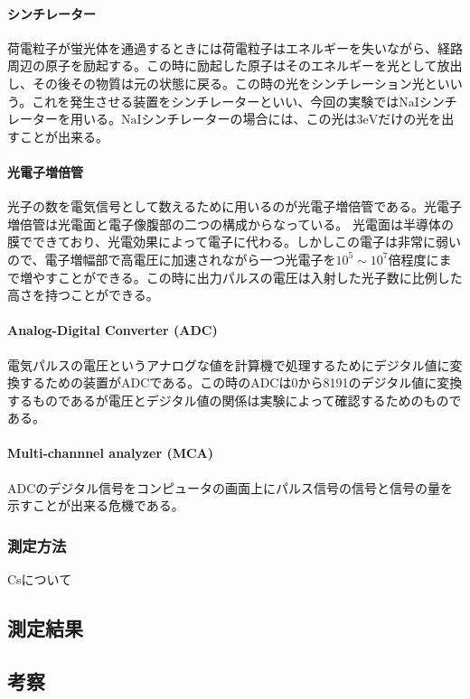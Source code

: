 \documentclass[titlepage]{ltjsarticle}
\begin{document}
\paragraph{シンチレーター}
荷電粒子が蛍光体を通過するときには荷電粒子はエネルギーを失いながら、経路周辺の原子を励起する。この時に励起した原子はそのエネルギーを光として放出し、その後その物質は元の状態に戻る。この時の光をシンチレーション光といいう。これを発生させる装置をシンチレーターといい、今回の実験では\(\mathrm{NaI}\)シンチレーターを用いる。\(\mathrm{NaI}\)シンチレーターの場合には、この光は\(3 \mathrm{eV}\)だけの光を出すことが出来る。

\paragraph{光電子増倍管}
光子の数を電気信号として数えるために用いるのが光電子増倍管である。光電子増倍管は光電面と電子像腹部の二つの構成からなっている。
光電面は半導体の膜でできており、光電効果によって電子に代わる。しかしこの電子は非常に弱いので、電子増幅部で高電圧に加速されながら一つ光電子を\(10^5\sim 10^7\)倍程度にまで増やすことができる。この時に出力パルスの電圧は入射した光子数に比例した高さを持つことができる。

\paragraph{Analog-Digital Converter (ADC)}
電気パルスの電圧というアナログな値を計算機で処理するためにデジタル値に変換するための装置がADCである。この時のADCは0から8191のデジタル値に変換するものであるが電圧とデジタル値の関係は実験によって確認するためのものである。

\paragraph{Multi-channnel analyzer (MCA)}
ADCのデジタル信号をコンピュータの画面上にパルス信号の信号と信号の量を示すことが出来る危機である。


\subsubsection{測定方法}
Csについて



\subsection{測定結果}


\subsection{考察}
\end{document}
